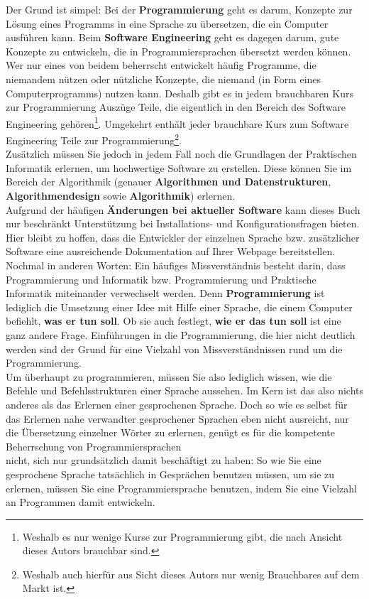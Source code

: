 Der Grund ist simpel: Bei der \textbf{Programmierung} geht es darum, Konzepte zur Lösung eines Programms in eine Sprache zu übersetzen, die ein Computer ausführen kann. Beim \textbf{Software Engineering} geht es dagegen darum, gute Konzepte zu entwickeln, die in Programmiersprachen übersetzt werden können. Wer nur eines von beidem beherrscht entwickelt häufig Programme, die niemandem nützen oder nützliche Konzepte, die niemand (in Form eines Computerprogramms) nutzen kann. Deshalb gibt es in jedem brauchbaren Kurs zur Programmierung Auszüge Teile, die eigentlich in den Bereich des Software Engineering gehören\footnote{Weshalb es nur wenige Kurse zur Programmierung gibt, die nach Ansicht dieses Autors brauchbar sind.}. Umgekehrt enthält jeder brauchbare Kurs zum Software Engineering Teile zur Programmierung\footnote{Weshalb auch hierfür aus Sicht dieses Autors nur wenig Brauchbares auf dem Markt ist.}.\\

Zusätzlich müssen Sie jedoch in jedem Fall noch die Grundlagen der Praktischen Informatik erlernen, um hochwertige Software zu erstellen. Diese können Sie im Bereich der Algorithmik (genauer \textbf{Algorithmen und Datenstrukturen}, \textbf{Algorithmendesign} sowie \textbf{Algorithmik}) erlernen.\\

Aufgrund der häufigen \textbf{Änderungen bei aktueller Software} kann dieses Buch nur beschränkt Unterstützung bei Installations- und Konfigurationsfragen bieten. Hier bleibt zu hoffen, dass die Entwickler der einzelnen Sprache bzw. zusätzlicher Software eine ausreichende Dokumentation auf Ihrer Webpage bereitstellen.\\

Nochmal in anderen Worten: Ein häufiges Missverständnis besteht darin, dass Programmierung und Informatik bzw. Programmierung und Praktische Informatik miteinander verwechselt werden. Denn \textbf{Programmierung} ist lediglich die Umsetzung einer Idee mit Hilfe einer Sprache, die einem Computer befiehlt, \textbf{was er tun soll}. Ob sie auch festlegt, \textbf{wie er das tun soll} ist eine ganz andere Frage. Einführungen in die Programmierung, die hier nicht deutlich werden sind der Grund für eine Vielzahl von Missverständnissen rund um die Programmierung.\\

Um überhaupt zu programmieren, müssen Sie also lediglich wissen, wie die Befehle und Befehlsstrukturen einer Sprache aussehen. Im Kern ist das also nichts anderes als das Erlernen einer gesprochenen Sprache. Doch so wie es selbst für das Erlernen nahe verwandter gesprochener Sprachen eben nicht ausreicht, nur die Übersetzung einzelner Wörter zu erlernen, genügt es für die kompetente Beherrschung von Programmiersprachen\\
nicht, sich nur grundsätzlich damit beschäftigt zu haben: So wie Sie eine gesprochene Sprache tatsächlich in Gesprächen benutzen müssen, um sie zu erlernen, müssen Sie eine Programmiersprache benutzen, indem Sie eine Vielzahl an Programmen damit entwickeln.\\

